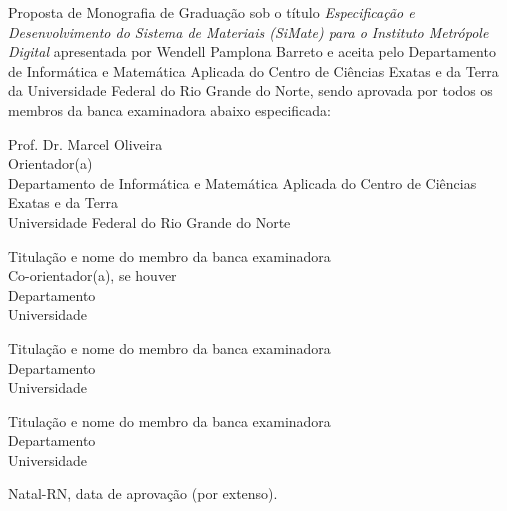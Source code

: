 \begin{folhadeaprovacao}
	\setlength{\ABNTsignthickness}{0.4pt}
	\setlength{\ABNTsignwidth}{10cm}
	
	\noindent 
	Proposta de Monografia de Graduação sob o título \textit{Especificação e Desenvolvimento do Sistema de Materiais (SiMate) para o Instituto Metrópole Digital} apresentada por 
	Wendell Pamplona Barreto e aceita pelo Departamento de Informática e Matemática Aplicada do
	Centro de Ciências Exatas e da Terra da Universidade Federal do Rio Grande do Norte,
	sendo aprovada por todos os membros da banca examinadora abaixo especificada:
		
	\assinatura
	{
		Prof. Dr. Marcel Oliveira\\
		{\small Orientador(a)} 															\\ 
		{\footnotesize
			Departamento de Informática e Matemática Aplicada do Centro de Ciências Exatas e da Terra \\
			Universidade Federal do Rio Grande do Norte
		}
	}
	
	\assinatura
	{
		Titulação e nome do membro da banca examinadora							\\
		{\small Co-orientador(a), se houver}										\\ 
		{\footnotesize
			Departamento 																	\\
		  	Universidade
		}
	}
		
	\assinatura
	{
		Titulação e nome do membro da banca examinadora 						 \\ 
		{\footnotesize
			Departamento 																	 \\
		  	Universidade
		}
	}
		
	\assinatura
	{
		Titulação e nome do membro da banca examinadora 						 \\ 
		{\footnotesize
			Departamento 																	 \\
		  	Universidade
		}
	}
		
	\vfill
	
	\begin{center}
		Natal-RN, data de aprovação (por extenso).
	\end{center}
\end{folhadeaprovacao}